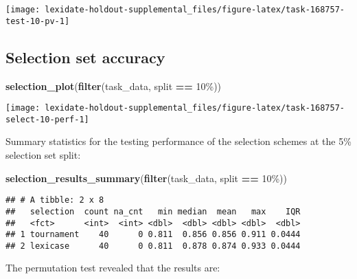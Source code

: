 \documentclass[
]{book}
\newenvironment{Shaded}{\begin{snugshade}}{\end{snugshade}}
\newcommand{\FunctionTok}[1]{\textcolor[rgb]{0.13,0.29,0.53}{\textbf{#1}}}
\newcommand{\NormalTok}[1]{#1}
\newcommand{\SpecialCharTok}[1]{\textcolor[rgb]{0.81,0.36,0.00}{\textbf{#1}}}
\newcommand{\StringTok}[1]{\textcolor[rgb]{0.31,0.60,0.02}{#1}}
\begin{document}
\texttt{[image: lexidate-holdout-supplemental\_files/figure-latex/task-168757-test-10-pv-1]}

\hypertarget{selection-set-accuracy-21}{%
\subsection{Selection set accuracy}\label{selection-set-accuracy-21}}

\begin{Shaded}
\begin{Highlighting}[]
\FunctionTok{selection\_plot}\NormalTok{(}\FunctionTok{filter}\NormalTok{(task\_data, split }\SpecialCharTok{==} \StringTok{\textquotesingle{}10\%\textquotesingle{}}\NormalTok{))}
\end{Highlighting}
\end{Shaded}

\texttt{[image: lexidate-holdout-supplemental\_files/figure-latex/task-168757-select-10-perf-1]}

Summary statistics for the testing performance of the selection schemes at the 5\% selection set split:

\begin{Shaded}
\begin{Highlighting}[]
\FunctionTok{selection\_results\_summary}\NormalTok{(}\FunctionTok{filter}\NormalTok{(task\_data, split }\SpecialCharTok{==} \StringTok{\textquotesingle{}10\%\textquotesingle{}}\NormalTok{))}
\end{Highlighting}
\end{Shaded}

\begin{verbatim}
## # A tibble: 2 x 8
##   selection  count na_cnt   min median  mean   max    IQR
##   <fct>      <int>  <int> <dbl>  <dbl> <dbl> <dbl>  <dbl>
## 1 tournament    40      0 0.811  0.856 0.856 0.911 0.0444
## 2 lexicase      40      0 0.811  0.878 0.874 0.933 0.0444
\end{verbatim}

The permutation test revealed that the results are:
\end{document}
